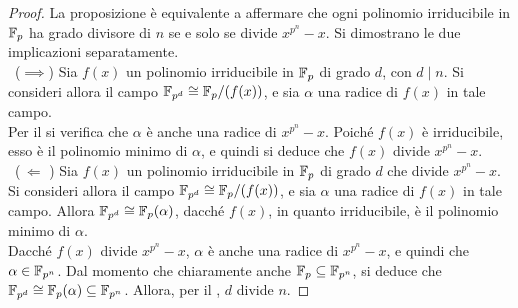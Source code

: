 \begin{proof}
    La proposizione è equivalente a affermare che ogni polinomio irriducibile in $\mathbb{F}_p$
    ha grado divisore di $n$ se e solo se divide $x^{p^n}-x$. Si dimostrano le
    due implicazioni separatamente. \\
    
    \ ($\implies$)\; Sia $f(x)$ un polinomio irriducibile in $\mathbb{F}_p$ di grado $d$, con
        $d \mid n$. Si consideri allora il campo $\mathbb{F}_{p^d} \cong \mathbb{F}_p/(f(x))$, e
        sia $\alpha$ una radice di $f(x)$ in tale campo. \\
        
        Per il  si verifica che $\alpha$ è anche una radice
        di $x^{p^n}-x$. Poiché $f(x)$ è irriducibile, esso è il polinomio minimo
        di $\alpha$, e quindi si deduce che $f(x)$ divide $x^{p^n}-x$. \\
    
    \ ($\,\Longleftarrow\,\,$)\; Sia $f(x)$ un polinomio irriducibile in $\mathbb{F}_p$ di grado
        $d$ che divide $x^{p^n}-x$. Si consideri allora il campo $\mathbb{F}_{p^d} \cong \mathbb{F}_p/(f(x))$,
        e sia $\alpha$ una radice di $f(x)$ in tale campo. Allora $\mathbb{F}_{p^d} \cong
        \mathbb{F}_p(\alpha)$, dacché $f(x)$, in quanto irriducibile, è il polinomio minimo
        di $\alpha$. \\
        
        Dacché $f(x)$ divide $x^{p^n}-x$, $\alpha$ è anche una radice
        di $x^{p^n}-x$, e quindi che $\alpha \in \mathbb{F}_{p^n}$. Dal momento che chiaramente
        anche $\mathbb{F}_p \subseteq \mathbb{F}_{p^n}$, si deduce che $\mathbb{F}_{p^d} \cong \mathbb{F}_p(\alpha) \subseteq
        \mathbb{F}_{p^n}$. Allora, per il , $d$ divide $n$.
\end{proof}